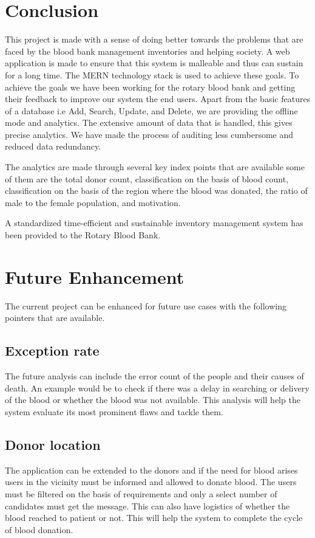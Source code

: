 \documentclass[BTech]{srmuthesis}
\begin{document}
\chapter{Conclusion}
This project is made with a sense of doing better towards the problems that are faced by the blood bank management inventories and helping society. A web application is made to ensure that this system is malleable and thus can sustain for a long time. The \ac{MERN} technology stack is used to achieve these goals. To achieve the goals we have been working for the rotary blood bank and getting their feedback to improve our system the end users. Apart from the basic features of a database i.e Add, Search, Update, and Delete, we are providing the offline mode and analytics. The extensive amount of data that is handled, this gives precise analytics. We have made the process of auditing less cumbersome and reduced data redundancy.\par
The analytics are made through several key index points that are available some of them are the total donor count, classification on the basis of blood count, classification on the basis of the region where the blood was donated, the ratio of male to the female population, and motivation.\par
A standardized time-efficient and sustainable inventory management system has been provided to the Rotary Blood Bank.


\chapter{Future Enhancement}
The current project can be enhanced for future use cases with the following pointers that are available.
\section{Exception rate}
The future analysis can include the error count of the people and their causes of death. An example would be to check if there was a delay in searching or delivery of the blood or whether the blood was not available. This analysis will help the system evaluate its most prominent flaws and tackle them.
\section{Donor location}
The application can be extended to the donors and if the need for blood arises users in the vicinity must be informed and allowed to donate blood. The users must be filtered on the basis of requirements and only a select number of candidates must get the message. This can also have logistics of whether the blood reached to patient or not. This will help the system to complete the cycle of blood donation.
\end{document}

